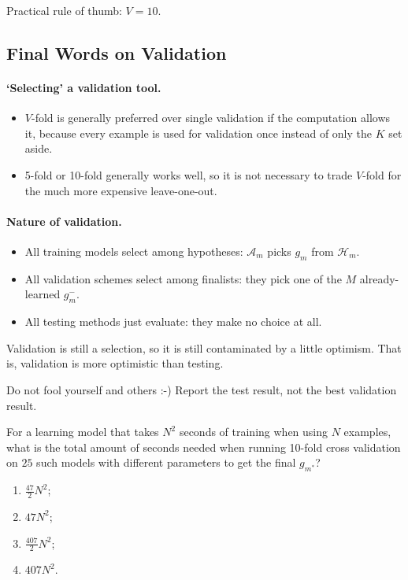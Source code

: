 \begin{moral}
    Practical rule of thumb: \(V = 10\).
\end{moral}

\subsection{Final Words on Validation}

\paragraph{`Selecting' a validation tool.}
\begin{itemize}
    \item \(V\)-fold is generally preferred over single validation if the
        computation allows it, because every example is used for validation
        once instead of only the \(K\) set aside.
    \item 5-fold or 10-fold generally works well, so it is not necessary to
        trade \(V\)-fold for the much more expensive leave-one-out.
\end{itemize}

\paragraph{Nature of validation.}
\begin{itemize}
    \item All training models select among hypotheses: \(\mathcal{A}_m\)
        picks \(g_m\) from \(\mathcal{H}_m\).
    \item All validation schemes select among finalists: they pick one of the
        \(M\) already-learned \(g_m^-\).
    \item All testing methods just evaluate: they make no choice at all.
\end{itemize}
Validation is still a selection, so it is still contaminated by a little
optimism. That is, validation is more optimistic than testing.

\begin{moral}
    Do not fool yourself and others :-) Report the test result, not the best
    validation result.
\end{moral}

\begin{exercise}
    For a learning model that takes \(N^2\) seconds of training when using
    \(N\) examples, what is the total amount of seconds needed when running
    10-fold cross validation on \(25\) such models with different parameters
    to get the final \(g_{m^*}\)?
    \begin{enumerate}[(1)]
        \item \(\frac{47}{2} N^2\);
        \item \(47N^2\);
        \item \(\frac{407}{2} N^2\);
        \item \(407N^2\).
    \end{enumerate}
\end{exercise}

